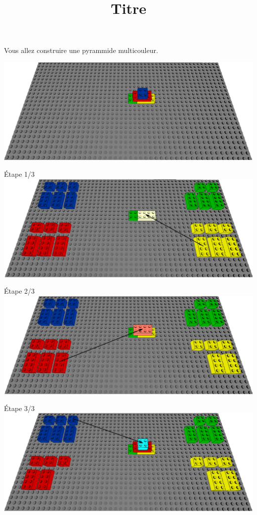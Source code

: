 \documentclass[aspectratio=169]{beamer}
\title{Titre}
\begin{document}
\begin{frame}
    Vous allez construire une pyrammide multicouleur.
    \vfill
    \begin{center}
        \includegraphics[width=\linewidth]{figure.png}
    \end{center}
\end{frame}

\begin{frame}
    Étape 1/3
    \vfill
  \includegraphics[width=\linewidth]{step1.png}
\end{frame}

\begin{frame}
    Étape 2/3
    \vfill
  \includegraphics[width=\linewidth]{step2.png}
\end{frame}

\begin{frame}
    Étape 3/3
    \vfill
  \includegraphics[width=\linewidth]{step3.png}
\end{frame}
\end{document}
